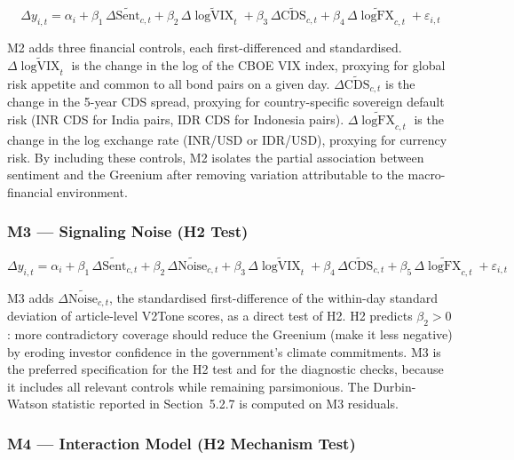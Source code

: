 \documentclass[12pt,a4paper]{article}
\begin{document}
\begin{equation}
\Delta y_{i,t} = \alpha_i + \beta_1 \,\Delta\widetilde{\text{Sent}}_{c,t} + \beta_2 \,\Delta\widetilde{\log\text{VIX}}_{t} + \beta_3 \,\Delta\widetilde{\text{CDS}}_{c,t} + \beta_4 \,\Delta\widetilde{\log\text{FX}}_{c,t} + \varepsilon_{i,t}
\label{eq:m2}
\end{equation}

M2 adds three financial controls, each first-differenced and standardised. $\Delta\widetilde{\log\text{VIX}}_t$ is the change in the log of the CBOE VIX index, proxying for global risk appetite and common to all bond pairs on a given day. $\Delta\widetilde{\text{CDS}}_{c,t}$ is the change in the 5-year CDS spread, proxying for country-specific sovereign default risk (INR CDS for India pairs, IDR CDS for Indonesia pairs). $\Delta\widetilde{\log\text{FX}}_{c,t}$ is the change in the log exchange rate (INR/USD or IDR/USD), proxying for currency risk. By including these controls, M2 isolates the partial association between sentiment and the Greenium after removing variation attributable to the macro-financial environment.

\subsubsection{M3 --- Signaling Noise (H2 Test)}

\begin{equation}
\Delta y_{i,t} = \alpha_i + \beta_1 \,\Delta\widetilde{\text{Sent}}_{c,t} + \beta_2 \,\Delta\widetilde{\text{Noise}}_{c,t} + \beta_3 \,\Delta\widetilde{\log\text{VIX}}_{t} + \beta_4 \,\Delta\widetilde{\text{CDS}}_{c,t} + \beta_5 \,\Delta\widetilde{\log\text{FX}}_{c,t} + \varepsilon_{i,t}
\label{eq:m3}
\end{equation}

M3 adds $\Delta\widetilde{\text{Noise}}_{c,t}$, the standardised first-difference of the within-day standard deviation of article-level V2Tone scores, as a direct test of H2. H2 predicts $\beta_2 > 0$: more contradictory coverage should reduce the Greenium (make it less negative) by eroding investor confidence in the government's climate commitments. M3 is the preferred specification for the H2 test and for the diagnostic checks, because it includes all relevant controls while remaining parsimonious. The Durbin-Watson statistic reported in Section~5.2.7 is computed on M3 residuals.

\subsubsection{M4 --- Interaction Model (H2 Mechanism Test)}
\end{document}
